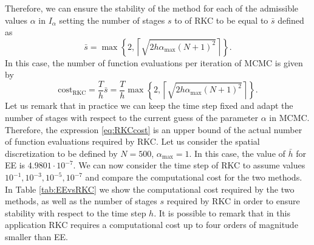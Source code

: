 \noindent Therefore, we can ensure the stability of the method for each of the admissible values $\alpha$ in $I_\alpha$ setting the number of stages $s$ to of RKC to be equal to $\bar s$ defined as
\begin{equation}\label{eq:nStagesRKC}
	\bar s = \max\left\{2, \left\lceil \sqrt{2h\alpha_{\max}(N+1)^2} \right\rceil\right\}.
\end{equation}
In this case, the number of function evaluations per iteration of MCMC is given by
\begin{equation}\label{eq:RKCcost}
	\mathrm{cost}_{\mathrm{RKC}} = \frac{T}{h}\bar s = \frac{T}{h} \max\left\{2, \left\lceil \sqrt{2h\alpha_{\max}(N+1)^2} \right\rceil\right\}.
\end{equation}
Let us remark that in practice we can keep the time step fixed and adapt the number of stages with respect to the current guess of the parameter $\alpha$ in MCMC. Therefore, the expression \eqref{eq:RKCcost} is an upper bound of the actual number of function evaluations required by RKC. Let us consider the spatial discretization to be defined by $N = 500$, $\alpha_{\max} = 1$. In this case, the value of $\bar h$ for EE is $4.9801\cdot 10^{-7}$. We can now consider the time step of RKC to assume values $10^{-1}, 10^{-3}, 10^{-5}, 10^{-7}$ and compare the computational cost for the two methods. In Table \ref{tab:EEvsRKC} we show the computational cost required by the two methods, as well as the number of stages $s$ required by RKC in order to ensure stability with respect to the time step $h$. It is possible to remark that in this application RKC requires a computational cost up to four orders of magnitude smaller than EE. \\

